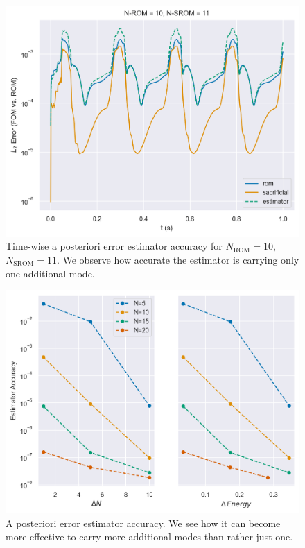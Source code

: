 \documentclass[../../thesis.tex]{subfiles}
\begin{document}
\newpage
\begin{figure}[h]
    \centering
    \includegraphics[width=1\columnwidth]{research_project/piston/figures/rb_certification/error_estimation_rom_10_srom_11.png}
    \caption{Time-wise a posteriori error estimator accuracy for $N_{\text{ROM}} = 10$, $N_{\text{SROM}} = 11$.
    We observe how accurate the estimator is carrying only one additional mode.}
    \label{fig:estimator_accuracy_timewise}
\end{figure}
\begin{figure}[h]
    \centering
    \includegraphics[width=1\columnwidth]{research_project/piston/figures/rb_certification/estimator_accuracy.png}
    \caption{A posteriori error estimator accuracy.
    We see how it can become more effective to carry more additional modes than rather just one.}
    \label{fig:estimator_accuracy}
\end{figure}
\end{document}
